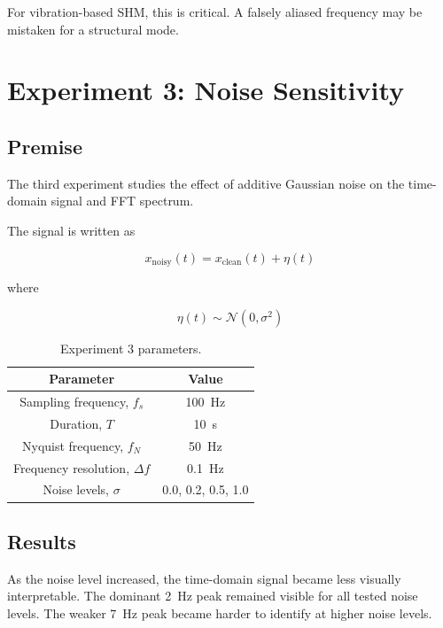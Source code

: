 \documentclass[11pt,a4paper]{article}
\begin{document}
For vibration-based SHM, this is critical. A falsely aliased frequency may be mistaken for a structural mode.

\section{Experiment 3: Noise Sensitivity}

\subsection{Premise}

The third experiment studies the effect of additive Gaussian noise on the time-domain signal and FFT spectrum.

The signal is written as

\begin{equation}
x_{\text{noisy}}(t) = x_{\text{clean}}(t) + \eta(t)
\end{equation}

where

\begin{equation}
\eta(t) \sim \mathcal{N}(0,\sigma^2)
\end{equation}

\begin{table}[H]
\centering
\caption{Experiment 3 parameters.}
\label{tab:exp3_params}
\begin{tabular}{cc}
\toprule
Parameter & Value \\
\midrule
Sampling frequency, \(f_s\) & \SI{100}{Hz} \\
Duration, \(T\) & \SI{10}{s} \\
Nyquist frequency, \(f_N\) & \SI{50}{Hz} \\
Frequency resolution, \(\Delta f\) & \SI{0.1}{Hz} \\
Noise levels, \(\sigma\) & 0.0, 0.2, 0.5, 1.0 \\
\bottomrule
\end{tabular}
\end{table}

\subsection{Results}

As the noise level increased, the time-domain signal became less visually interpretable. The dominant \SI{2}{Hz} peak remained visible for all tested noise levels. The weaker \SI{7}{Hz} peak became harder to identify at higher noise levels.
\end{document}
